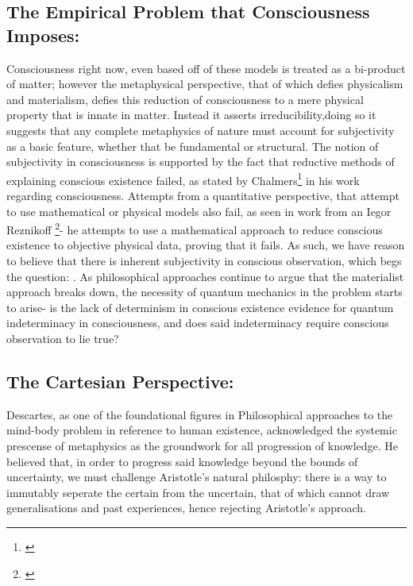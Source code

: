 \documentclass[openany,oneside,12pt,hidelinks]{book}
\begin{document}
\subsection{The Empirical Problem that Consciousness Imposes:}
Consciousness right now, even based off of these models is treated as a bi-product of matter; however the metaphysical perspective, that of which defies physicalism and materialism, defies this reduction of consciousness to a mere physical property that is innate in matter.
Instead it asserts irreducibility,doing so it suggests that any complete metaphysics of nature must account for subjectivity as a basic feature, whether that be fundamental or structural.
The notion of subjectivity in consciousness is supported by the fact that reductive methods of explaining conscious existence failed, as stated by Chalmers\footnote{\cite{10.1093/acprof:oso/9780195311105.003.0001}} in his work regarding consciousness.
Attempts from a quantitative perspective, that attempt to use mathematical or physical models also fail, as seen in work from an Iegor Reznikoff \footnote{\cite{reznikoff2021logicaltopologicalproofirreducibility}}- he attempts to use a mathematical approach to reduce conscious existence to objective physical data, proving that it fails.
As such, we have reason to believe that there is inherent subjectivity in conscious observation, which begs the question: .
As philosophical approaches continue to argue that the materialist approach breaks down, the necessity of quantum mechanics in the problem starts to arise- is the lack of determinism in conscious existence evidence for quantum indeterminacy in consciousness, and does said indeterminacy require conscious observation to lie true?
\newpage
\subsection{The Cartesian Perspective:}
Descartes, as one of the foundational figures in Philosophical approaches to the mind-body problem in reference to human existence, acknowledged the systemic prescense of metaphysics as the groundwork for all progression of knowledge. He believed that, in order to progress said knowledge beyond the bounds of uncertainty, we must challenge Aristotle's natural philosphy: there is a way to immutably seperate the certain from the uncertain, that of which cannot draw generalisations and past experiences, hence rejecting Aristotle's approach.
\printbibliography
\end{document}
